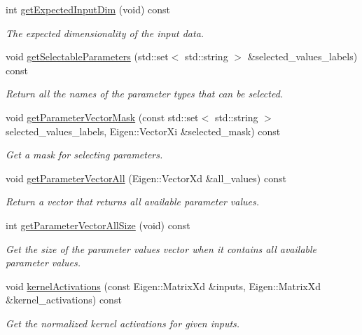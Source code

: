 \begin{DoxyCompactItemize}
int \hyperlink{classDmpBbo_1_1ModelParametersGPR_af5a550bcf65d5a29a153a594cc4e3fa1}{get\+Expected\+Input\+Dim} (void) const 
\begin{DoxyCompactList}\small\item\em The expected dimensionality of the input data. \end{DoxyCompactList}\item 
void \hyperlink{classDmpBbo_1_1ModelParametersGPR_a887f4747734bd8b7cc4f799092ff31b4}{get\+Selectable\+Parameters} (std\+::set$<$ std\+::string $>$ \&selected\+\_\+values\+\_\+labels) const 
\begin{DoxyCompactList}\small\item\em Return all the names of the parameter types that can be selected. \end{DoxyCompactList}\item 
void \hyperlink{classDmpBbo_1_1ModelParametersGPR_a9dba1f93e426e7511630ec1ece4ace17}{get\+Parameter\+Vector\+Mask} (const std\+::set$<$ std\+::string $>$ selected\+\_\+values\+\_\+labels, Eigen\+::\+Vector\+Xi \&selected\+\_\+mask) const 
\begin{DoxyCompactList}\small\item\em Get a mask for selecting parameters. \end{DoxyCompactList}\item 
void \hyperlink{classDmpBbo_1_1ModelParametersGPR_a29429ff2771d1e56cfba7250d38da4b1}{get\+Parameter\+Vector\+All} (Eigen\+::\+Vector\+Xd \&all\+\_\+values) const 
\begin{DoxyCompactList}\small\item\em Return a vector that returns all available parameter values. \end{DoxyCompactList}\item 
int \hyperlink{classDmpBbo_1_1ModelParametersGPR_ab24d2485b3b795b516f4844f225100eb}{get\+Parameter\+Vector\+All\+Size} (void) const 
\begin{DoxyCompactList}\small\item\em Get the size of the parameter values vector when it contains all available parameter values. \end{DoxyCompactList}\item 
void \hyperlink{classDmpBbo_1_1ModelParametersGPR_a125cc60559b55f7348beb15f25834b6f}{kernel\+Activations} (const Eigen\+::\+Matrix\+Xd \&inputs, Eigen\+::\+Matrix\+Xd \&kernel\+\_\+activations) const 
\begin{DoxyCompactList}\small\item\em Get the normalized kernel activations for given inputs. \end{DoxyCompactList}\item 

\end{DoxyCompactItemize}

